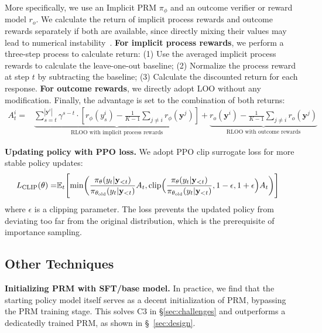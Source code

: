 More specifically, we use an Implicit PRM $\pi_\phi$ and an outcome verifier or reward model $r_o$.
We calculate the return of implicit process rewards and outcome rewards separately if both are available, since directly mixing their values may lead to numerical instability~\citep{deepseek-math}.
\textbf{For implicit process rewards}, we perform a three-step process to calculate return:
(1) Use the averaged implicit process rewards to calculate the leave-one-out baseline;
(2) Normalize the process reward at step $t$ by subtracting the baseline;
(3) Calculate the discounted return for each response.
\textbf{For outcome rewards}, we directly adopt LOO without any modification.
Finally, the advantage is set to the combination of both returns:
\begin{equation}
\label{eq:adv}
    \begin{aligned}
        A^i_t = &\underbrace{\sum_{s=t}^{|\mathbf{y}^i|} \gamma^{s-t} \cdot \left[r_\phi(y^i_s)-\frac{1}{K-1} \sum_{j \neq i} r_\phi \left(\mathbf{y}^j\right)\right]}_\text{RLOO with implicit process rewards}+\underbrace{r_o\left(\mathbf{y}^i\right)-\frac{1}{K-1} \sum_{j \neq i} r_o\left(\mathbf{y}^j\right)}_\text{RLOO with outcome rewards}
    \end{aligned}
\end{equation}

\textbf{Updating policy with PPO loss.}
We adopt PPO clip surrogate loss for more stable policy updates: 
\begin{equation}
\begin{aligned}
\label{eq:clip}
    L_{\text{CLIP}}(\theta) = &\mathbb{E}_t\Biggl[\min\biggl(\frac{\pi_\theta(y_t|\mathbf{y}_{<t})}{\pi_{\theta_{\text{old}}}(y_t|\mathbf{y}_{<t})}A_t,\text{clip}\Bigl(\frac{\pi_\theta(y_t|\mathbf{y}_{<t})}{\pi_{\theta_{\text{old}}}(y_t|\mathbf{y}_{<t})}, 1-\epsilon, 1+\epsilon\Bigr)A_t\biggr)\Biggr]
\end{aligned}
\end{equation}
where $\epsilon$ is a clipping parameter. The loss prevents the updated policy from deviating too far from the original distribution, which is the prerequisite of importance sampling. 



\subsection{Other Techniques}
\label{sec:prime_init_filter}
\textbf{Initializing PRM with SFT/base model.}
In practice, we find that the starting policy model itself serves as a decent initialization of PRM, bypassing the PRM training stage. This solves C3 in \S \ref{sec:challenges} and outperforms a dedicatedly trained PRM, as shown in \S~\ref{sec:design}.


